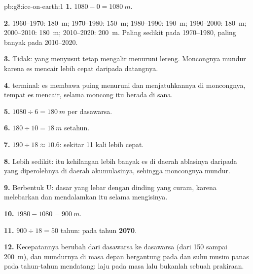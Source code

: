 \begin{solution}{pb:g8:ice-on-earth:1}
\textbf{1.} $1080 - 0 = \qty{1080}{m}$.

\textbf{2.} 1960--1970: \qty{180}{m}; 1970--1980: \qty{150}{m};
1980--1990: \qty{190}{m}; 1990--2000: \qty{180}{m}; 2000--2010:
\qty{180}{m}; 2010--2020: \qty{200}{m}. Paling sedikit pada 1970--1980,
paling banyak pada 2010--2020.

\textbf{3.} Tidak:  yang menyusut tetap mengalir menuruni lereng.
Moncongnya mundur karena es mencair lebih cepat daripada datangnya.

\textbf{4.}  terminal: es membawa puing  menuruni  dan
menjatuhkannya di moncongnya, tempat es mencair, selama moncong itu
berada di sana.

\textbf{5.} $1080 \div 6 = \qty{180}{m}$ per dasawarsa.

\textbf{6.} $180 \div 10 = \qty{18}{m}$ setahun.

\textbf{7.} $190 \div 18 \approx 10.6$: sekitar 11 kali lebih cepat.

\textbf{8.} Lebih sedikit:  itu kehilangan lebih banyak es di
daerah ablasinya daripada yang diperolehnya di daerah akumulasinya,
sehingga moncongnya mundur.

\textbf{9.} Berbentuk U: dasar yang lebar dengan dinding yang curam,
karena  melebarkan dan mendalamkan  itu selama mengisinya.

\textbf{10.} $1980 - 1080 = \qty{900}{m}$.

\textbf{11.} $900 \div 18 = 50$ tahun: pada tahun \textbf{2070}.

\textbf{12.} Kecepatannya berubah dari dasawarsa ke dasawarsa (dari 150
sampai \qty{200}{m}), dan mundurnya di masa depan bergantung pada 
 dan suhu musim panas pada tahun-tahun mendatang: laju pada masa
lalu bukanlah sebuah prakiraan.
\end{solution}
